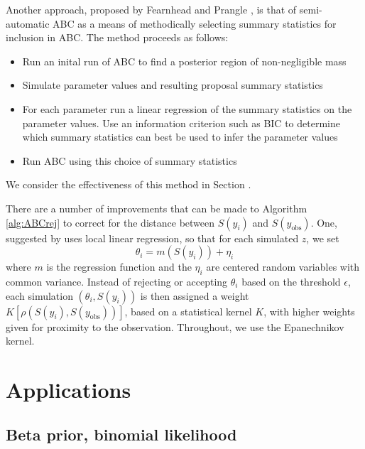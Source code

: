 \documentclass[a4paper,10pt]{article}
\begin{document}
Another approach, proposed by Fearnhead and Prangle \cite{Fearnhead2012}, is that of semi-automatic ABC as a means of methodically selecting summary statistics for inclusion in ABC. The method proceeds as follows:

\begin{itemize}
\item Run an inital run of ABC to find a posterior region of non-negligible mass
\item Simulate parameter values and resulting proposal summary statistics
\item For each parameter run a linear regression of the summary statistics on the parameter values. Use an information criterion such as BIC to determine which summary statistics can best be used to infer the parameter values
\item Run ABC using this choice of summary statistics
\end{itemize}

We consider the effectiveness of this method in Section \cite{sec:saabc}.

There are a number of improvements that can be made to Algorithm \ref{alg:ABCrej} to correct for the distance between $S(y_i)$ and $S(y_\textrm{obs})$. One, suggested by \cite{beaumont2002} uses local linear regression, so that for each simulated $z$, we set 
\[
\theta_i = m(S(y_i)) + \eta_i
\]
where $m$ is the regression function and the $\eta_i$ are centered random variables with common variance. Instead of rejecting or accepting $\theta_i$ based on the threshold $\epsilon$, each simulation $(\theta_i, S(y_i))$ is then assigned a weight $K[\rho(S(y_i), S(y_\textrm{obs}))]$, based on a statistical kernel $K$, with higher weights given for proximity to the observation. Throughout, we use the Epanechnikov kernel. 

\section{Applications}
\subsection{Beta prior, binomial likelihood} \label{sec:beta-bin}
\end{document}
